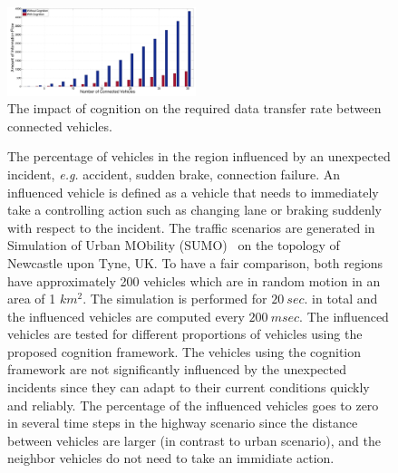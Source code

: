 \documentclass[journal, 11pt]{IEEEtran}
\begin{document}
\begin{figure}[!t]
  \centering
  \includegraphics[width=0.49\textwidth]{figs/infoFlow.pdf}
  \caption{{\fontsize{10}{10}\selectfont The impact of cognition on the required
  data transfer rate between connected vehicles.}}
  \label{fig:infoFlow}
   \vspace*{-5mm}
\end{figure}

\begin{figure}[!t]
  \begin{center}
  \caption{\fontsize{10}{10}\selectfont The percentage of vehicles in the region
  influenced by an unexpected incident, \textit{e.g.} accident, sudden brake,
  connection failure. An influenced vehicle is defined as a vehicle that needs
  to immediately take a controlling action such as changing lane or braking
  suddenly with respect to the incident. The traffic scenarios are generated in
  Simulation of Urban MObility (SUMO)~\cite{sumo} on the topology of Newcastle
  upon Tyne, UK. To have a fair comparison, both regions have approximately 200
  vehicles which are in random motion in an area of 1 $km^2$. The simulation is
  performed for $20~sec.$ in total and the influenced vehicles are computed
  every $200~msec$. The influenced vehicles are tested for different proportions
  of vehicles using the proposed cognition framework. The vehicles using the
  cognition framework are not significantly influenced by the unexpected
  incidents since they can adapt to their current conditions quickly and
  reliably. The percentage of the influenced vehicles goes to zero in several
  time steps in the highway scenario since the distance between vehicles are
  larger (in contrast to urban scenario), and the neighbor vehicles do not need
  to take an immidiate action.}
  \label{fig:effectedVeh}
  \vspace*{-6mm}
  \end{center}
\end{figure}
\end{document}

